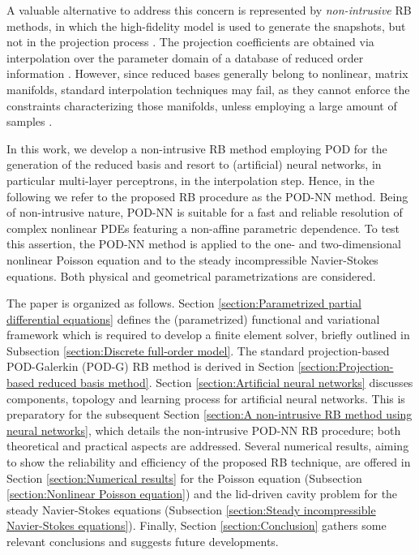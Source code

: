 \documentclass[longtitle]{elsarticle}
\numberwithin{equation}{section}
\theoremstyle{theorem}
\theoremstyle{definition}
\theoremstyle{remark}
\theoremstyle{proposition}
\numberwithin{figure}{section}
\begin{document}
		A valuable alternative to address this concern is represented by \emph{non-intrusive} RB methods, in which the high-fidelity model is used to generate the snapshots, but not in the projection process \cite{Chen17}. The projection coefficients are obtained via interpolation over the parameter domain of a database of reduced order information \cite{Cas15}. However, since reduced bases generally belong to nonlinear, matrix manifolds, standard interpolation techniques may fail, as they cannot enforce the constraints characterizing those manifolds, unless employing a large amount of samples \cite{Ams10, BNR00}. 
		
		In this work, we develop a non-intrusive RB method employing POD for the generation of the reduced basis and resort to (artificial) neural networks, in particular multi-layer perceptrons, in the interpolation step. Hence, in the following we refer to the proposed RB procedure as the POD-NN method. Being of non-intrusive nature, POD-NN is suitable for a fast and reliable resolution of complex nonlinear PDEs featuring a non-affine parametric dependence. To test this assertion, the POD-NN method is applied to the one- and two-dimensional nonlinear Poisson equation and to the steady incompressible Navier-Stokes equations. Both physical and geometrical parametrizations are considered.
				
		The paper is organized as follows. Section \ref{section:Parametrized partial differential equations} defines the (parametrized) functional and variational framework which is required to develop a finite element solver, briefly outlined in Subsection \ref{section:Discrete full-order model}. The standard projection-based POD-Galerkin (POD-G) RB method is derived in Section \ref{section:Projection-based reduced basis method}. Section \ref{section:Artificial neural networks} discusses components, topology and learning process for artificial neural networks. This is preparatory for the subsequent Section \ref{section:A non-intrusive RB method using neural networks}, which details the non-intrusive POD-NN RB procedure; both theoretical and practical aspects are addressed. Several numerical results, aiming to show the reliability and efficiency of the proposed RB technique, are offered in Section \ref{section:Numerical results} for the Poisson equation (Subsection \ref{section:Nonlinear Poisson equation}) and the lid-driven cavity problem for the steady Navier-Stokes equations (Subsection \ref{section:Steady incompressible Navier-Stokes equations}). Finally, Section \ref{section:Conclusion} gathers some relevant conclusions and suggests future developments.
		
\end{document}

